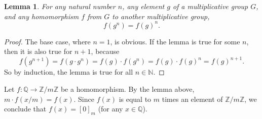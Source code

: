 \documentclass[12pt]{article}
\newtheorem{lem}[thm]{Lemma}
\begin{document}
\bigskip
\noindent{}\bigskip

\begin{lem}
    For any natural number $n$, any element $g$ of a multiplicative group $G$, and any homomorphism $f$ from $G$ to another multiplicative group,
    \[ f(g^n)=f(g)^n. \]
\end{lem}
\begin{proof}
    The base case, where $n=1$, is obvious. If the lemma is true for some $n$, then it is also true for $n+1$, because
    \[ f(g^{n+1}) = f(g \cdot g^n) = f(g) \cdot f(g^n) = f(g) \cdot f(g)^n = f(g)^{n+1}. \]
    So by induction, the lemma is true for all $n \in \mathbb{N}$.
\end{proof}

Let $f: \mathbb{Q} \rightarrow \mathbb{Z} / m \mathbb{Z}$ be a homomorphism. By the lemma above, $m \cdot f(x/m) = f(x)$. Since $f(x)$ is equal to $m$ times an element of $\mathbb{Z}/m\mathbb{Z}$, we conclude that $f(x) = [0]_m$ (for any $x \in \mathbb{Q}$).
\end{document}
